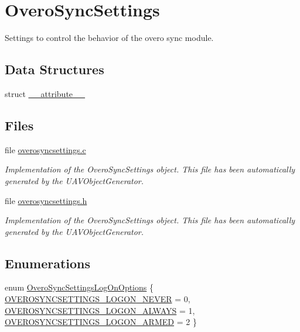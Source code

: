 \hypertarget{group___overo_sync_settings}{\section{\-Overo\-Sync\-Settings}
\label{group___overo_sync_settings}
}


\-Settings to control the behavior of the overo sync module.  


\subsection*{\-Data \-Structures}
\begin{DoxyCompactItemize}
\item 
struct \hyperlink{struct____attribute____}{\-\_\-\-\_\-attribute\-\_\-\-\_\-}
\end{DoxyCompactItemize}
\subsection*{\-Files}
\begin{DoxyCompactItemize}
\item 
file \hyperlink{overosyncsettings_8c}{overosyncsettings.\-c}
\begin{DoxyCompactList}\small\item\em \-Implementation of the \-Overo\-Sync\-Settings object. \-This file has been automatically generated by the \-U\-A\-V\-Object\-Generator. \end{DoxyCompactList}\item 
file \hyperlink{overosyncsettings_8h}{overosyncsettings.\-h}
\begin{DoxyCompactList}\small\item\em \-Implementation of the \-Overo\-Sync\-Settings object. \-This file has been automatically generated by the \-U\-A\-V\-Object\-Generator. \end{DoxyCompactList}\end{DoxyCompactItemize}
\subsection*{\-Enumerations}
\begin{DoxyCompactItemize}
\item 
enum \hyperlink{group___overo_sync_settings_gab90b2c6b7f7bd258ca22bd88cee89c97}{\-Overo\-Sync\-Settings\-Log\-On\-Options} \{ \hyperlink{group___overo_sync_settings_ggab90b2c6b7f7bd258ca22bd88cee89c97aa6de9c8b635ef25040492b516630c0c7}{\-O\-V\-E\-R\-O\-S\-Y\-N\-C\-S\-E\-T\-T\-I\-N\-G\-S\-\_\-\-L\-O\-G\-O\-N\-\_\-\-N\-E\-V\-E\-R} = 0, 
\hyperlink{group___overo_sync_settings_ggab90b2c6b7f7bd258ca22bd88cee89c97a8bf9ac3f9230ede2a82c474a44a02403}{\-O\-V\-E\-R\-O\-S\-Y\-N\-C\-S\-E\-T\-T\-I\-N\-G\-S\-\_\-\-L\-O\-G\-O\-N\-\_\-\-A\-L\-W\-A\-Y\-S} = 1, 
\hyperlink{group___overo_sync_settings_ggab90b2c6b7f7bd258ca22bd88cee89c97ac817760f824dbd76d49d8e1fc69a403e}{\-O\-V\-E\-R\-O\-S\-Y\-N\-C\-S\-E\-T\-T\-I\-N\-G\-S\-\_\-\-L\-O\-G\-O\-N\-\_\-\-A\-R\-M\-E\-D} = 2
 \}
\end{DoxyCompactItemize}
